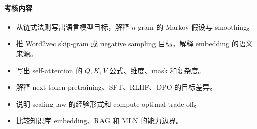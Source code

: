 \documentclass[11pt]{ctexart}
\begin{document}
\paragraph{考核内容}

\begin{itemize}
  \item 从链式法则写出语言模型目标，解释 \(n\)-gram 的 Markov 假设与 smoothing。
  \item 推 Word2vec skip-gram 或 negative sampling 目标，解释 embedding 的语义来源。
  \item 写出 self-attention 的 \(Q,K,V\) 公式、维度、mask 和复杂度。
  \item 解释 next-token pretraining、SFT、RLHF、DPO 的目标差异。
  \item 说明 scaling law 的经验形式和 compute-optimal trade-off。
  \item 比较知识库 embedding、RAG 和 MLN 的能力边界。
\end{itemize}

\printbibliography[heading=bibintoc,title={参考文献与官方来源}]
\end{document}
